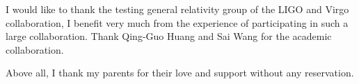 I would like to thank the testing general relativity group of the LIGO and Virgo collaboration, I benefit very much from the experience of participating in such a large collaboration.
Thank Qing-Guo Huang and Sai Wang for the academic collaboration.

Above all, I thank my parents for their love and support without any reservation.


\noindent


